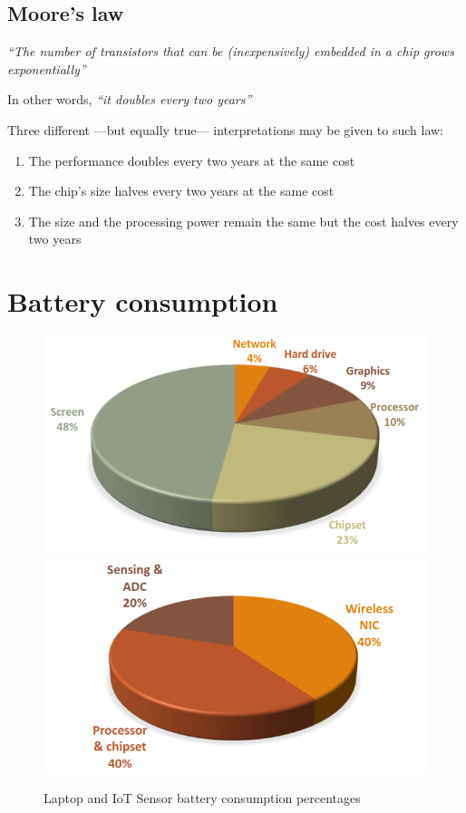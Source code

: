 \subsection{Moore's law}
\begin{center}
   
   \textit{``The number of transistors that can be (inexpensively) embedded in a chip grows exponentially''}
   
   In other words, \textit{``it doubles every two years''}
\end{center}

Three different ---but equally true--- interpretations may be given to such law:
\begin{enumerate}
   \item The performance doubles every two years at the same cost
   \item The chip’s size halves every two years at the same cost
   \item The size and the processing power remain the same but the cost
   halves every two years
\end{enumerate}

\section{Battery consumption}

\begin{figure}[htbp]
   \centering
   \includegraphics[width=0.45\columnwidth]{images/iot_laptop_consumption.png}
   \includegraphics[width=0.45\columnwidth]{images/iot_sensor_consumption.png}
   \caption{Laptop and IoT Sensor battery consumption percentages}
   \label{fig:iot_sensor_consumption}
\end{figure}

